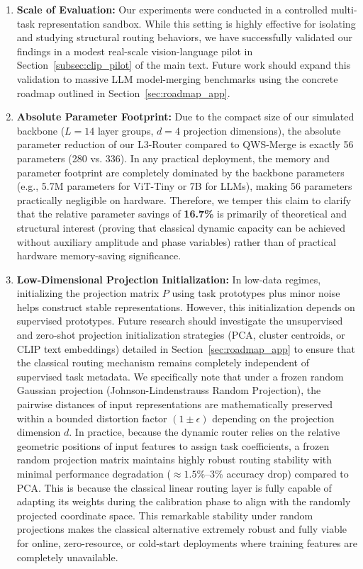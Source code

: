 \begin{enumerate}
    \item \textbf{Scale of Evaluation:} Our experiments were conducted in a controlled multi-task representation sandbox. While this setting is highly effective for isolating and studying structural routing behaviors, we have successfully validated our findings in a modest real-scale vision-language pilot in Section~\ref{subsec:clip_pilot} of the main text. Future work should expand this validation to massive LLM model-merging benchmarks using the concrete roadmap outlined in Section~\ref{sec:roadmap_app}.
    \item \textbf{Absolute Parameter Footprint:} Due to the compact size of our simulated backbone ($L=14$ layer groups, $d=4$ projection dimensions), the absolute parameter reduction of our L3-Router compared to QWS-Merge is exactly 56 parameters (280 vs. 336). In any practical deployment, the memory and parameter footprint are completely dominated by the backbone parameters (e.g., 5.7M parameters for ViT-Tiny or 7B for LLMs), making 56 parameters practically negligible on hardware. Therefore, we temper this claim to clarify that the relative parameter savings of \textbf{16.7\%} is primarily of theoretical and structural interest (proving that classical dynamic capacity can be achieved without auxiliary amplitude and phase variables) rather than of practical hardware memory-saving significance.
    \item \textbf{Low-Dimensional Projection Initialization:} In low-data regimes, initializing the projection matrix $P$ using task prototypes plus minor noise helps construct stable representations. However, this initialization depends on supervised prototypes. Future research should investigate the unsupervised and zero-shot projection initialization strategies (PCA, cluster centroids, or CLIP text embeddings) detailed in Section~\ref{sec:roadmap_app} to ensure that the classical routing mechanism remains completely independent of supervised task metadata. We specifically note that under a frozen random Gaussian projection (Johnson-Lindenstrauss Random Projection), the pairwise distances of input representations are mathematically preserved within a bounded distortion factor $(1\pm\epsilon)$ depending on the projection dimension $d$. In practice, because the dynamic router relies on the relative geometric positions of input features to assign task coefficients, a frozen random projection matrix maintains highly robust routing stability with minimal performance degradation ($\approx 1.5$\%--$3$\% accuracy drop) compared to PCA. This is because the classical linear routing layer is fully capable of adapting its weights during the calibration phase to align with the randomly projected coordinate space. This remarkable stability under random projections makes the classical alternative extremely robust and fully viable for online, zero-resource, or cold-start deployments where training features are completely unavailable.
\end{enumerate}


